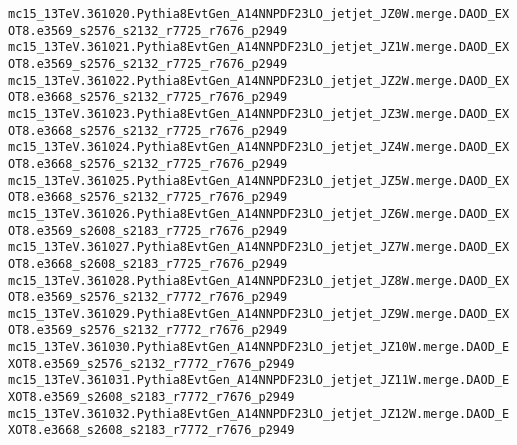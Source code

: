 {\scriptsize
\verb|mc15_13TeV.361020.Pythia8EvtGen_A14NNPDF23LO_jetjet_JZ0W.merge.DAOD_EXOT8.e3569_s2576_s2132_r7725_r7676_p2949|\\
\verb|mc15_13TeV.361021.Pythia8EvtGen_A14NNPDF23LO_jetjet_JZ1W.merge.DAOD_EXOT8.e3569_s2576_s2132_r7725_r7676_p2949|\\
\verb|mc15_13TeV.361022.Pythia8EvtGen_A14NNPDF23LO_jetjet_JZ2W.merge.DAOD_EXOT8.e3668_s2576_s2132_r7725_r7676_p2949|\\
\verb|mc15_13TeV.361023.Pythia8EvtGen_A14NNPDF23LO_jetjet_JZ3W.merge.DAOD_EXOT8.e3668_s2576_s2132_r7725_r7676_p2949|\\
\verb|mc15_13TeV.361024.Pythia8EvtGen_A14NNPDF23LO_jetjet_JZ4W.merge.DAOD_EXOT8.e3668_s2576_s2132_r7725_r7676_p2949|\\
\verb|mc15_13TeV.361025.Pythia8EvtGen_A14NNPDF23LO_jetjet_JZ5W.merge.DAOD_EXOT8.e3668_s2576_s2132_r7725_r7676_p2949|\\
\verb|mc15_13TeV.361026.Pythia8EvtGen_A14NNPDF23LO_jetjet_JZ6W.merge.DAOD_EXOT8.e3569_s2608_s2183_r7725_r7676_p2949|\\
\verb|mc15_13TeV.361027.Pythia8EvtGen_A14NNPDF23LO_jetjet_JZ7W.merge.DAOD_EXOT8.e3668_s2608_s2183_r7725_r7676_p2949|\\
\verb|mc15_13TeV.361028.Pythia8EvtGen_A14NNPDF23LO_jetjet_JZ8W.merge.DAOD_EXOT8.e3569_s2576_s2132_r7772_r7676_p2949|\\
\verb|mc15_13TeV.361029.Pythia8EvtGen_A14NNPDF23LO_jetjet_JZ9W.merge.DAOD_EXOT8.e3569_s2576_s2132_r7772_r7676_p2949|\\
\verb|mc15_13TeV.361030.Pythia8EvtGen_A14NNPDF23LO_jetjet_JZ10W.merge.DAOD_EXOT8.e3569_s2576_s2132_r7772_r7676_p2949|\\
\verb|mc15_13TeV.361031.Pythia8EvtGen_A14NNPDF23LO_jetjet_JZ11W.merge.DAOD_EXOT8.e3569_s2608_s2183_r7772_r7676_p2949|\\
\verb|mc15_13TeV.361032.Pythia8EvtGen_A14NNPDF23LO_jetjet_JZ12W.merge.DAOD_EXOT8.e3668_s2608_s2183_r7772_r7676_p2949|
}



